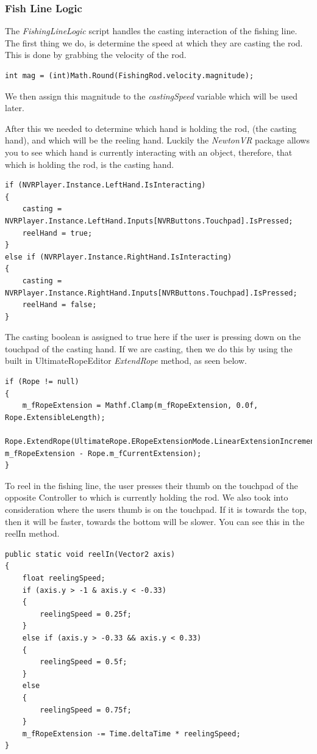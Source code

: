 \documentclass[10pt,journal,compsoc,onecolumn, draftclsnofoot]{IEEEtran}
\begin{document}
\subsubsection{Fish Line Logic}
The \textit{FishingLineLogic} script handles the casting interaction of the fishing line.
The first thing we do, is determine the speed at which they are casting the rod. This is done by grabbing the velocity of the rod.
\begin{lstlisting}[language={[Sharp]C}]
int mag = (int)Math.Round(FishingRod.velocity.magnitude);
\end{lstlisting}
We then assign this magnitude to the \textit{castingSpeed} variable which will be used later.

After this we needed to determine which hand is holding the rod, (the casting hand), and which will be the reeling hand. Luckily the \textit{NewtonVR} package allows you to see which hand is currently interacting with an object, therefore, that which is holding the rod, is the casting hand.

\begin{lstlisting}[language={[Sharp]C}]
if (NVRPlayer.Instance.LeftHand.IsInteracting)
{
	casting = NVRPlayer.Instance.LeftHand.Inputs[NVRButtons.Touchpad].IsPressed;
	reelHand = true;
}
else if (NVRPlayer.Instance.RightHand.IsInteracting)
{
	casting = NVRPlayer.Instance.RightHand.Inputs[NVRButtons.Touchpad].IsPressed;
	reelHand = false;
}
\end{lstlisting}

The casting boolean is assigned to true here if the user is pressing down on the touchpad of the casting hand. If we are casting, then we do this by using the built in UltimateRopeEditor \textit{ExtendRope} method, as seen below.
\begin{lstlisting}[language={[Sharp]C}]
if (Rope != null)
{
	m_fRopeExtension = Mathf.Clamp(m_fRopeExtension, 0.0f, Rope.ExtensibleLength);
	Rope.ExtendRope(UltimateRope.ERopeExtensionMode.LinearExtensionIncrement, m_fRopeExtension - Rope.m_fCurrentExtension);
}
\end{lstlisting}

To reel in the fishing line, the user presses their thumb on the touchpad of the opposite Controller to which is currently holding the rod. We also took into consideration where the users thumb is on the touchpad. If it is towards the top, then it will be faster, towards the bottom will be slower. You can see this in the reelIn method.

\begin{lstlisting}[language={[Sharp]C}]
public static void reelIn(Vector2 axis)
{
	float reelingSpeed;
	if (axis.y > -1 & axis.y < -0.33)
	{
		reelingSpeed = 0.25f;
	}
	else if (axis.y > -0.33 && axis.y < 0.33)
	{
		reelingSpeed = 0.5f;
	}
	else
	{
		reelingSpeed = 0.75f;
	}
	m_fRopeExtension -= Time.deltaTime * reelingSpeed;
}
\end{lstlisting}
\end{document}
